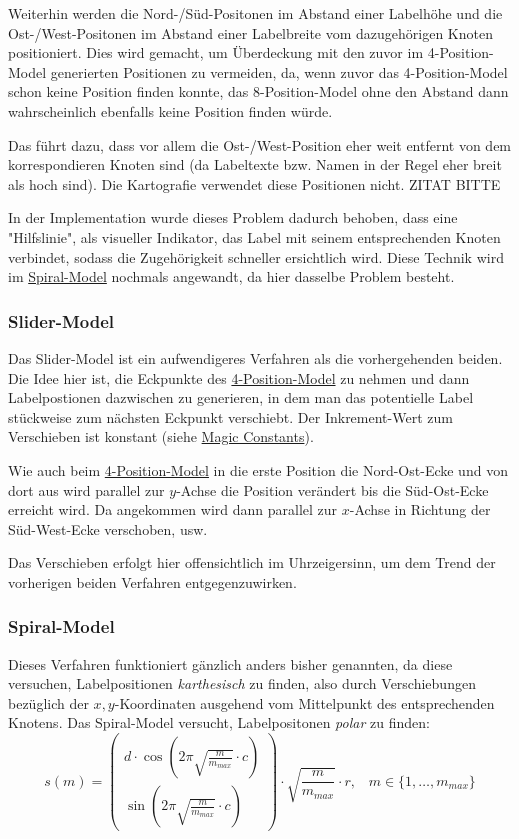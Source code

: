 Weiterhin werden die Nord-/Süd-Positonen im Abstand einer Labelhöhe und die Ost-/West-Positonen im Abstand einer Labelbreite vom dazugehörigen Knoten positioniert.
Dies wird gemacht, um Überdeckung mit den zuvor im 4-Position-Model generierten Positionen zu vermeiden, da, wenn zuvor das 4-Position-Model schon keine Position finden konnte,
das 8-Position-Model ohne den Abstand dann wahrscheinlich ebenfalls keine Position finden würde.

Das führt dazu, dass vor allem die Ost-/West-Position eher weit entfernt von dem korrespondieren Knoten sind (da Labeltexte bzw. Namen in der Regel eher breit als hoch sind).
Die Kartografie verwendet diese Positionen nicht. ZITAT BITTE

In der Implementation wurde dieses Problem dadurch behoben, dass eine "Hilfslinie", als visueller Indikator, das Label mit seinem entsprechenden Knoten verbindet,
sodass die Zugehörigkeit schneller ersichtlich wird.
Diese Technik wird im \hyperref[subsubsec:spiral]{Spiral-Model} nochmals angewandt, da hier dasselbe Problem besteht.

\subsubsection{Slider-Model}
\label{subsubsec:slider}
Das Slider-Model ist ein aufwendigeres Verfahren als die vorhergehenden beiden. Die Idee hier ist, die Eckpunkte des \hyperref[subsubsec:4pos]{4-Position-Model} zu nehmen
und dann Labelpostionen dazwischen zu generieren, in dem man das potentielle Label stückweise zum nächsten Eckpunkt verschiebt. Der Inkrement-Wert zum Verschieben ist konstant (siehe \hyperref[subsec:consts]{Magic Constants}).

Wie auch beim \hyperref[subsubsec:4pos]{4-Position-Model} in die erste Position die Nord-Ost-Ecke und von dort aus wird parallel zur $y$-Achse die Position verändert bis die Süd-Ost-Ecke erreicht wird.
Da angekommen wird dann parallel zur $x$-Achse in Richtung der Süd-West-Ecke verschoben, usw.

Das Verschieben erfolgt hier offensichtlich im Uhrzeigersinn, um dem Trend der vorherigen beiden Verfahren entgegenzuwirken.


\subsubsection{Spiral-Model}
\label{subsubsec:spiral}

Dieses Verfahren funktioniert gänzlich anders bisher genannten, da diese versuchen, Labelpositionen \textit{karthesisch} zu finden, also durch Verschiebungen
bezüglich der $x,y$-Koordinaten ausgehend vom Mittelpunkt des entsprechenden Knotens. Das Spiral-Model versucht, Labelpositonen \textit{polar} zu finden:
$$ s(m) =
    \left(\begin{array}{c}
              d \cdot \cos (2 \pi \sqrt{\frac{m}{m_{max}}} \cdot c) \\
    \sin (2 \pi \sqrt{\frac{m}{m_{max}}} \cdot c)\end{array}\right) \cdot \sqrt{\frac{m}{m_{max}}} \cdot r,\; \; \; m \in \{1, \dots, m_{max} \}
$$

